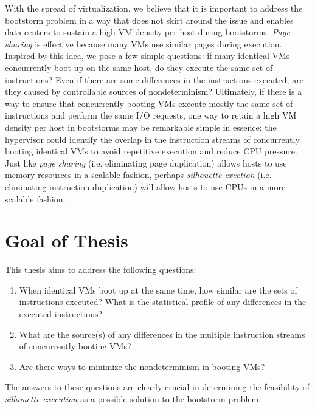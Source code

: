 With the spread of virtualization, we believe that it is important to address the
bootstorm problem in a way that does not skirt around the issue
and enables data centers to sustain a high VM density per host
during bootstorms. {\em Page sharing} is effective
because many VMs use similar pages during execution.
Inspired by this idea, we pose a few simple questions: 
if many identical VMs concurrently boot up on the same host,
do they execute the same set of instructions? Even if there are
some differences in the instructions executed, are they caused by
controllable sources of nondeterminism? Ultimately, if there is a way
to ensure that concurrently booting VMs execute mostly the same set of instructions
and perform the same I/O requests, one way to retain a high VM density 
per host in bootstorms may be remarkable simple in essence:
the hypervisor could identify the overlap in the instruction streams of concurrently
booting identical VMs to avoid repetitive execution and reduce
CPU pressure. Just like {\em page sharing} (i.e. eliminating page
duplication) allows hosts to use memory resources in a scalable fashion,
perhaps {\em silhouette exection} (i.e. eliminating
instruction duplication) will allow hosts
to use CPUs in a more scalable fashion.

\section{Goal of Thesis}
This thesis aims to address the following questions:

\begin{enumerate}

\item When identical VMs boot up at the same time, how similar
are the sets of instructions executed? What is the statistical
profile of any differences in the executed instructions?

\item What are the source(s) of any differences in
the multiple instruction streams of concurrently booting VMs?

\item Are there ways to minimize the nondeterminism in
booting VMs?

\end{enumerate}

The answers to these questions are clearly crucial in determining
the feasibility of \emph{silhouette execution} as a possible solution
to the bootstorm problem. 

